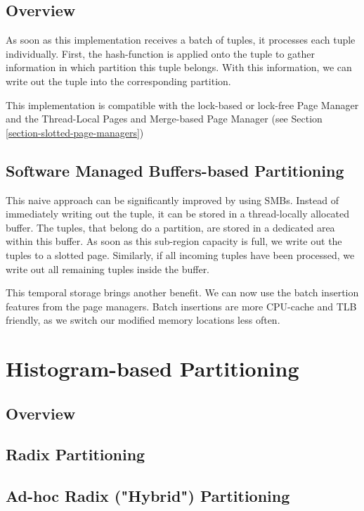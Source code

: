 \subsection{Overview}
As soon as this implementation receives a batch of tuples, it processes each tuple individually.
First, the hash-function is applied onto the tuple to gather information in which partition this tuple belongs.
With this information, we can write out the tuple into the corresponding partition.

This implementation is compatible with the lock-based or lock-free Page Manager and the Thread-Local Pages and Merge-based Page Manager (see Section \ref{section-slotted-page-managers})

\subsection{Software Managed Buffers-based Partitioning}

This naive approach can be significantly improved by using \acfp{SMB}.
Instead of immediately writing out the tuple, it can be stored in a thread-locally allocated buffer.
The tuples, that belong do a partition, are stored in a dedicated area within this buffer.
As soon as this sub-region capacity is full, we write out the tuples to a slotted page.
Similarly, if all incoming tuples have been processed, we write out all remaining tuples inside the buffer.

This temporal storage brings another benefit.
We can now use the batch insertion features from the page managers.
Batch insertions are more \ac{CPU}-cache and \ac{TLB} friendly, as we switch our modified memory locations less often.

\section{Histogram-based Partitioning}
\subsection{Overview}
\subsection{Radix Partitioning}
\subsection{Ad-hoc Radix ("Hybrid") Partitioning}


